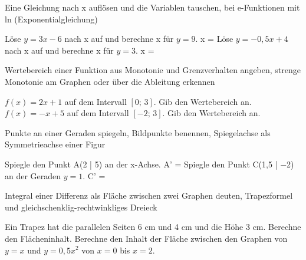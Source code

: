 \setcounter{aufgabe}{0}

\begin{aufgabe}{Eine Gleichung nach x auflösen und die Variablen tauschen, bei e-Funktionen mit ln (Exponentialgleichung)}
\begin{teile}
\teil Löse $y = 3x - 6$ nach x auf und berechne x für $y = 9$. x = \leerfeld
\teil Löse $y = -0{,}5x + 4$ nach x auf und berechne x für $y = 3$. x = \leerfeld
\end{teile}
\end{aufgabe}

\begin{aufgabe}{Wertebereich einer Funktion aus Monotonie und Grenzverhalten angeben, strenge Monotonie am Graphen oder über die Ableitung erkennen}
\begin{teile}
\teil $f(x) = 2x + 1$ auf dem Intervall $[0;\, 3]$. Gib den Wertebereich an.
\teil $f(x) = -x + 5$ auf dem Intervall $[-2;\, 3]$. Gib den Wertebereich an.
\end{teile}
\end{aufgabe}

\begin{aufgabe}{Punkte an einer Geraden spiegeln, Bildpunkte benennen, Spiegelachse als Symmetrieachse einer Figur}
\begin{teile}
\teil Spiegle den Punkt A(2 | 5) an der x-Achse. A' = \leerfeld
\teil Spiegle den Punkt C(1,5 | −2) an der Geraden $y = 1$. C' = \leerfeld
\end{teile}
\end{aufgabe}

\begin{aufgabe}{Integral einer Differenz als Fläche zwischen zwei Graphen deuten, Trapezformel und gleichschenklig-rechtwinkliges Dreieck}
\begin{teile}
\teil Ein Trapez hat die parallelen Seiten 6 cm und 4 cm und die Höhe 3 cm. Berechne den Flächeninhalt. \leerfeld
\teil Berechne den Inhalt der Fläche zwischen den Graphen von $y = x$ und $y = 0{,}5x^2$ von $x = 0$ bis $x = 2$. \leerfeld
\end{teile}
\end{aufgabe}

